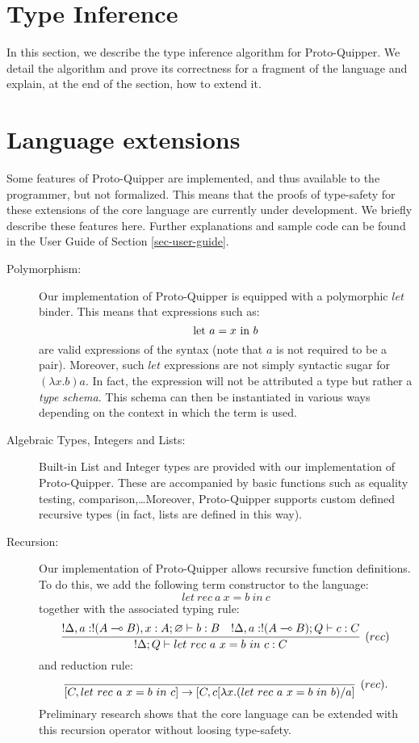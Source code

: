\documentclass[twoside]{article}
\begin{document}
\clearpage
\section{Type Inference}

In this section, we describe the type inference algorithm 
for Proto-Quipper. We detail the algorithm and prove its 
correctness for a fragment of the language and explain, 
at the end of the section, how to extend it.




\clearpage
\section{Language extensions}
\label{sec-extensions}

Some features of Proto-Quipper are implemented, and thus available 
to the programmer, but not formalized. This means that the proofs 
of type-safety for these extensions of the core language are 
currently under development. We briefly describe these features 
here. Further explanations and sample code can be found in the 
User Guide of Section \ref{sec-user-guide}.
\begin{description}
  \item[Polymorphism:] Our implementation of Proto-Quipper is 
    equipped with a polymorphic $let$ binder. This means that 
    expressions such as:
    \[
    \text{let}~ a = x ~\text{in}~ b
    \]
    are valid expressions of the syntax (note that $a$ is not required 
    to be a pair). Moreover, such $let$ expressions are not simply 
    syntactic sugar for $(\lambda x.b)a$. In fact, the expression
    will not be attributed a type but rather a \emph{type schema}.
    This schema can then be instantiated in various ways depending 
    on the context in which the term is used. 
  \item[Algebraic Types, Integers and Lists:] Built-in List and 
    Integer types are provided with our implementation of Proto-Quipper.
    These are accompanied by basic functions such as equality testing, 
    comparison,\ldots Moreover, Proto-Quipper supports custom defined
    recursive types (in fact, lists are defined in this way).
  \item[Recursion:] Our implementation of Proto-Quipper allows 
    recursive function definitions. To do this, we add the following 
    term constructor to the language:
    \[
    let~rec~ a ~x = b~ in~ c
    \]    
    together with the associated typing rule:
    \[
    \infer[(rec)]{!\Delta;Q \entails let~rec~ a ~x = b~ in~ c:C}{
      !\Delta,a:!(A\loli B), x:A;\varnothing \entails b:B
      &
      !\Delta, a:!(A\loli B) ;Q \entails c:C      
    }
    \]
    and reduction rule:
    \[
    \infer[(rec).]{[C,let~rec~ a ~x = b~ in~ c]\to [C, c[\lambda x.(let~rec~ a ~x = b~ in~ b)/a]}{}
    \]
    Preliminary research shows that the core language can be extended 
    with this recursion operator without loosing type-safety. 
\end{description}
\end{document}
